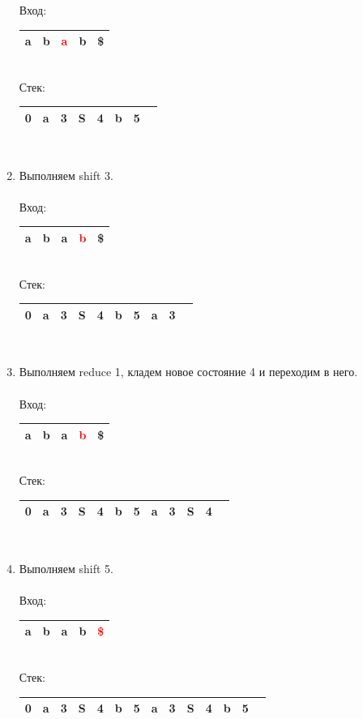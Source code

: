 \begin{example}
\begin{enumerate}
Вход: \,
\begin{tabular}[c]{ |c|c|c|c|c| } 
    \hline a & b & \textcolor{red}{a} & b & \$ \\ \hline
\end{tabular}\\
Стек: \,
\begin{tabular}[c]{ |c|c|c|c|c|c|c|c } 
    \hline 0 & a & 3 & S & 4 & b & 5 & \\ \hline
\end{tabular}
\\
\item Выполняем shift 3. \\ \\
Вход: \,
\begin{tabular}[c]{ |c|c|c|c|c| } 
    \hline a & b & a & \textcolor{red}{b} & \$ \\ \hline
\end{tabular} \\
Стек: \,
\begin{tabular}[c]{ |c|c|c|c|c|c|c|c|c|c } 
    \hline 0 & a & 3 & S & 4 & b & 5 & a & 3 & \\ \hline
\end{tabular}
\\
\item Выполняем reduce 1, кладем новое состояние 4 и переходим в него. \\ \\
Вход: \,
\begin{tabular}[c]{ |c|c|c|c|c| } 
    \hline a & b & a & \textcolor{red}{b} & \$ \\ \hline
\end{tabular}\\
Стек: \,
\begin{tabular}[c]{ |c|c|c|c|c|c|c|c|c|c|c|c } 
    \hline 0 & a & 3 & S & 4 & b & 5 & a & 3 & S & 4 & \\ \hline
\end{tabular}
\\
\item Выполняем shift 5. \\ \\
Вход: \,
\begin{tabular}[c]{ |c|c|c|c|c| } 
    \hline a & b & a & b & \textcolor{red}{\$} \\ \hline
\end{tabular} \\
Стек: \,
\begin{tabular}[c]{ |c|c|c|c|c|c|c|c|c|c|c|c|c|c } 
    \hline 0 & a & 3 & S & 4 & b & 5 & a & 3 & S & 4 & b & 5 & \\ \hline

\end{tabular}
\end{enumerate}
\end{example}

